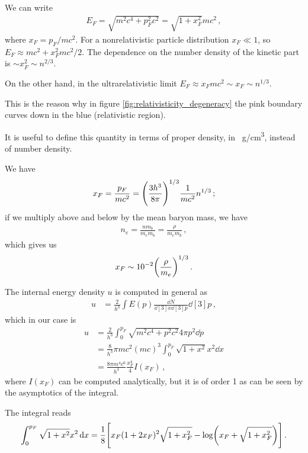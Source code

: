 \documentclass[main.tex]{subfiles}
\begin{document}
We can write 
%
\begin{align}
E_F = \sqrt{m^2 c^{4} + p_F^2 c^2} = \sqrt{1 + x_F^2} m c^2
\,,
\end{align}
%
where \(x_F = p_F / mc^2\).
For a nonrelativistic particle distribution \(x_F \ll 1\), so \(E_F \approx mc^2 + x_F^2 mc^2/2\). 
The dependence on the number density of the kinetic part is \(\sim x_F^{2} \sim n^{2/3}\). 

On the other hand, in the ultrarelativistic limit \(E_F \approx x_F mc^2 \sim x_F \sim n^{1/3}\).

This is the reason why in figure \ref{fig:relativisticity_degeneracy} the pink boundary curves down in the blue (relativistic region). 

It is useful to define this quantity in terms of proper density, in \SI{}{g/cm^3}, instead of number density.

We have 
%
\begin{align}
x_F = \frac{p_F}{mc^2} = \qty( \frac{3h^3}{8 \pi })^{1/3} \frac{1}{mc^2} n^{1/3}
\,;
\end{align}
%
if we multiply above and below by the mean baryon mass, we have 
%
\begin{align}
n_e = \frac{n m_b}{m_e m_b} = \frac{\rho}{m_e m_b} 
\,,
\end{align}
%
which gives us 
%
\begin{align}
x_F \sim \num{e-2} \qty(\frac{\rho }{m_e})^{1/3}
\,.
\end{align}


The internal energy density \(u\) is computed in general as 
%
\begin{align}
u &= \frac{2}{h^3}\int E(p) \frac{ \dd{N}}{ \dd[3]{x} \dd[3]{p}} \dd[3]{p} 
\,,
\end{align}
%
which in our case is 
%
\begin{align}
u &= \frac{2}{h^3} \int_{0}^{p_F} \sqrt{m^2c^{4} + p^2c^2} 4 \pi p^2 \dd{p}  \\
&= \frac{8}{h^3} \pi  mc^2 (mc)^3 \int_0^{p_F} \sqrt{1 + x^2} x^2 \dd{x}  \\
&= \frac{8 \pi m^4 c^{6}}{h^3} \frac{x_F^{4}}{4} I(x_F)
\,,
\end{align}
%
where \(I(x_F)\) can be computed analytically, but it is of order 1 as can be seen by the asymptotics of the integral. 

The integral reads 
%
\begin{align}
\int_0^{p_F} \sqrt{1 + x^2} x^2 \dd{x} = \frac{1}{8} \qty[x_F (1 + 2 x_F)^2 \sqrt{1 + x_F^2} - \log(x_F + \sqrt{1 + x_F^2})]
\,.
\end{align}
\end{document}
